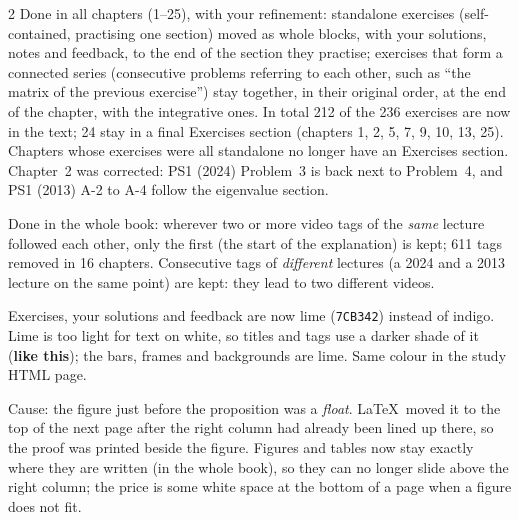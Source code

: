 \begin{paracol}{2}
{Done in all chapters (1--25), with your refinement: standalone exercises (self-contained, practising one section) moved as whole blocks, with your solutions, notes and feedback, to the end of the section they practise; exercises that form a connected series (consecutive problems referring to each other, such as ``the matrix of the previous exercise'') stay together, in their original order, at the end of the chapter, with the integrative ones. In total 212 of the 236 exercises are now in the text; 24 stay in a final Exercises section (chapters 1, 2, 5, 7, 9, 10, 13, 25). Chapters whose exercises were all standalone no longer have an Exercises section. Chapter~2 was corrected: PS1 (2024) Problem~3 is back next to Problem~4, and PS1 (2013) A-2 to A-4 follow the eigenvalue section.}

{Done in the whole book: wherever two or more video tags of the \emph{same} lecture followed each other, only the
first (the start of the explanation) is kept; 611 tags removed in 16 chapters. Consecutive tags of
\emph{different} lectures (a 2024 and a 2013 lecture on the same point) are kept: they lead to two different videos.}

{Exercises, your solutions and feedback are now lime (\texttt{7CB342}) instead of indigo. Lime is too light for
text on white, so titles and tags use a darker shade of it (\textcolor{exerdark}{\textbf{like this}}); the
bars, frames and backgrounds are lime. Same colour in the study HTML page.}

{Cause: the figure just before the proposition was a \emph{float}. \LaTeX\ moved it to the top of the next page
after the right column had already been lined up there, so the proof was printed beside the figure. Figures
and tables now stay exactly where they are written (in the whole book), so they can no longer slide above
the right column; the price is some white space at the bottom of a page when a figure does not fit.}


\end{paracol}
